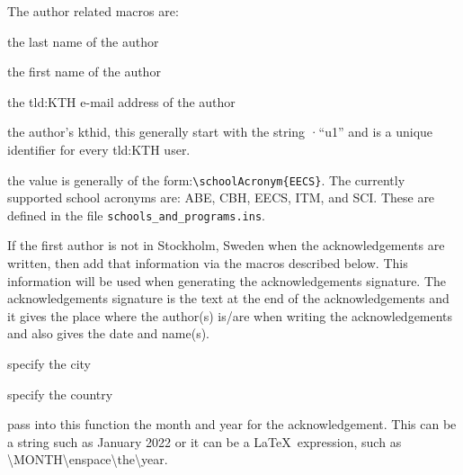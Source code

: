 The author related macros are:
\begin{description}[leftmargin=!, labelwidth =\widthof{\texttt{\textbackslash secondAuthorsFirstname\{\}}}]
\item [\texttt{\textbackslash authorsLastname\{\}}] the last name of the author

\item [\texttt{\textbackslash authorsFirstname\{\}}] the first name of the author

\item [\texttt{\textbackslash email\{\}}] the \gls{tld:KTH} e-mail address of the author

\item [\texttt{\textbackslash kthid\{\}}] the author's kthid, this generally start with the string ·``u1'' and is a unique identifier for every \gls{tld:KTH} user.

\item [\texttt{\textbackslash authorsSchool\{\}}] the value is generally of the form:\linebreak[4] \texttt{\textbackslash schoolAcronym\{EECS\}}. The currently supported school acronyms are: ABE, CBH, EECS, ITM, and SCI. These are defined in the file \texttt{schools\_and\_programs.ins}.
\end{description}

If the first author is not in Stockholm, Sweden when the acknowledgements are written, then add that information via the macros described below.
This information will be used when generating the acknowledgements signature. The acknowledgements signature is the text at the end of the acknowledgements and it gives the place where the author(s) is/are when writing the acknowledgements and also gives the date and name(s).
\begin{description}[leftmargin=!, labelwidth =\widthof{\texttt{\textbackslash secondAuthorsFirstname\{\}}}]
\item [\texttt{\textbackslash authorCity\{A City\}}] specify the city

\item [\texttt{\textbackslash authorCountry\{A Country\}}] specify the country

\item [\texttt{\textbackslash authorCityCountryDate\{\}}] pass into this function the month and year for the acknowledgement. This can be a string such as January 2022 or it can be a \LaTeX\ expression, such as \textbackslash MONTH\textbackslash enspace\textbackslash the\textbackslash year.
\end{description}

